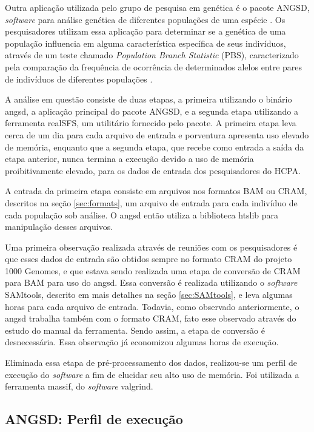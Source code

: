 \documentclass[cic,tc]{iiufrgs}
\begin{document}
Outra aplicação utilizada pelo grupo de pesquisa em genética é o pacote ANGSD,
\textit{software} para análise genética de diferentes populações de uma
espécie \cite{korneliussen2014angsd}. Os pesquisadores utilizam essa aplicação
para determinar se a genética de uma população influencia em alguma
característica específica de seus indivíduos, através de um teste chamado
\textit{Population Branch Statistic} (PBS), caracterizado pela comparação da
frequência de ocorrência de determinados alelos entre pares de
indivíduos de diferentes populações \cite{yi2010sequencing}.

A análise em questão consiste de duas etapas, a primeira utilizando o binário
angsd, a aplicação principal do pacote ANGSD, e a segunda etapa utilizando a
ferramenta realSFS, um utilitário fornecido pelo pacote. A primeira etapa leva
cerca de um dia para cada arquivo de entrada e porventura apresenta uso elevado
de memória, enquanto que a segunda etapa, que recebe como entrada a saída da
etapa anterior, nunca termina a execução devido a uso de memória
proibitivamente elevado, para os dados de entrada dos pesquisadores do HCPA.

A entrada da primeira etapa consiste em arquivos nos formatos BAM ou CRAM,
descritos na seção \ref{sec:formats}, um arquivo de entrada para cada indivíduo
de cada população sob análise. O angsd então utiliza a biblioteca
htslib para manipulação desses arquivos.

Uma primeira observação realizada através de reuniões com os pesquisadores é
que esses dados de entrada são obtidos sempre no formato CRAM do projeto 1000
Genomes, e que estava sendo realizada uma etapa de conversão de CRAM para BAM
para uso do angsd. Essa conversão é realizada utilizando o \textit{software} SAMtools,
descrito em mais detalhes na seção \ref{sec:SAMtools}, e leva algumas horas
para cada arquivo de entrada. Todavia, como observado anteriormente, o angsd
trabalha também com o formato CRAM, fato esse observado através do estudo do
manual da ferramenta. Sendo assim, a etapa de conversão é desnecessária. Essa
observação já economizou algumas horas de execução.

Eliminada essa etapa de pré-processamento dos dados, realizou-se um perfil de
execução do \textit{software} a fim de elucidar seu alto uso de memória. Foi utilizada a
ferramenta massif, do \textit{software} valgrind.

\subsection{ANGSD: Perfil de execução}
\end{document}
